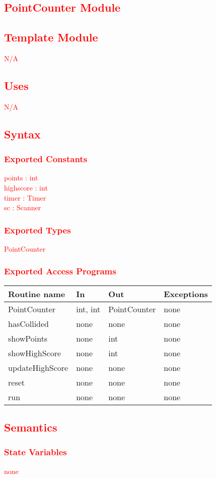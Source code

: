\documentclass[12pt, titlepage]{article}
\begin{document}
\textcolor{red}{
\section {PointCounter Module}
\subsection{Template Module}
N/A 
\subsection {Uses}
N/A
\subsection {Syntax}
\subsubsection{Exported Constants}
points : int\\
highscore : int\\
timer : Timer \\
sc : Scanner 
\subsubsection {Exported Types}
PointCounter
\subsubsection {Exported Access Programs}
\begin{tabular}{| l | l | l | l |}
\hline
\textbf{Routine name} & \textbf{In} & \textbf{Out} & \textbf{Exceptions}\\
\hline
PointCounter & int, int & PointCounter & none\\
\hline
hasCollided & none & none & none\\
\hline
showPoints & none & int & none\\
\hline
showHighScore & none & int & none\\
\hline
updateHighScore & none & none & none\\
\hline
reset & none & none & none\\
\hline
run & none & none & none\\
\hline
\end{tabular}
\subsection {Semantics}
\subsubsection {State Variables}
none
}
\end{document}
